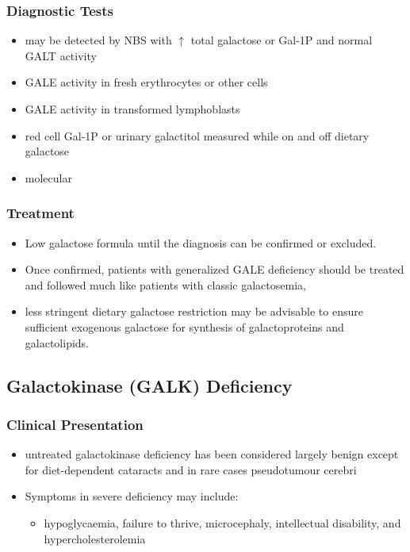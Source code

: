 \documentclass{scrartcl}
\begin{document}
\subsubsection{Diagnostic Tests}
\label{sec:org01b70ad}
\begin{itemize}
\item may be detected by NBS with \(\uparrow\) total galactose or Gal-1P and normal GALT activity
\item GALE activity in fresh erythrocytes or other cells
\item GALE activity in transformed lymphoblasts
\item red cell Gal-1P or urinary galactitol measured while on and off dietary galactose
\item molecular
\end{itemize}

\subsubsection{Treatment}
\label{sec:orgaf0f4fd}
\begin{itemize}
\item Low galactose formula until the diagnosis can be confirmed or excluded.
\item Once confirmed, patients with generalized GALE deficiency should be
treated and followed much like patients with classic galactosemia,
\item less stringent dietary galactose restriction may be advisable to
ensure sufficient exogenous galactose for synthesis of galactoproteins and galactolipids.
\end{itemize}
\subsection{Galactokinase (GALK) Deficiency}
\label{sec:orgffcdbc2}
\subsubsection{Clinical Presentation}
\label{sec:org0f4bbaa}
\begin{itemize}
\item untreated galactokinase deficiency has been considered largely
benign except for diet-dependent cataracts and in rare cases pseudotumour cerebri
\item Symptoms in severe deficiency may include:
\begin{itemize}
\item hypoglycaemia, failure to thrive, microcephaly, intellectual
disability, and hypercholesterolemia
\end{itemize}
\end{itemize}
\end{document}

